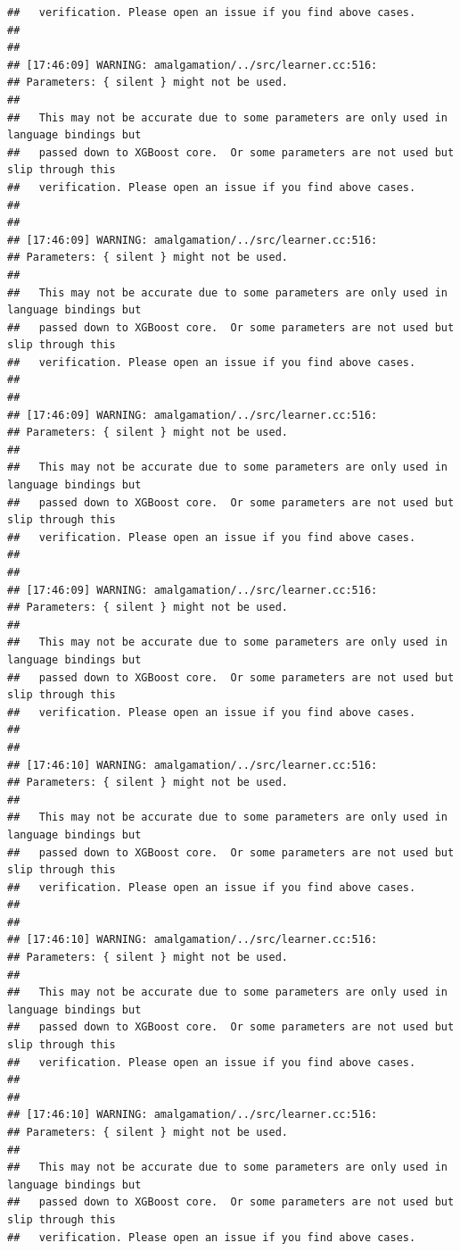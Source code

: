 \documentclass[AMS,STIX2COL]{WileyNJD-v2}\usepackage[]{graphicx}\usepackage[]{color}
\makeatletter
\newenvironment{kframe}{%
 \def\at@end@of@kframe{}%
 \ifinner\ifhmode%
  \def\at@end@of@kframe{\end{minipage}}%
  \begin{minipage}{\columnwidth}%
 \fi\fi%
 \def\FrameCommand##1{\hskip\@totalleftmargin \hskip-\fboxsep
 \colorbox{shadecolor}{##1}\hskip-\fboxsep
     \hskip-\linewidth \hskip-\@totalleftmargin \hskip\columnwidth}%
 \MakeFramed {\advance\hsize-\width
   \@totalleftmargin\z@ \linewidth\hsize
   \@setminipage}}%
 {\par\unskip\endMakeFramed%
 \at@end@of@kframe}
\newenvironment{knitrout}{}{} %
\makeatother
\begin{document}
\begin{knitrout}
\begin{kframe}
\begin{verbatim}
##   verification. Please open an issue if you find above cases.
## 
## 
## [17:46:09] WARNING: amalgamation/../src/learner.cc:516: 
## Parameters: { silent } might not be used.
## 
##   This may not be accurate due to some parameters are only used in language bindings but
##   passed down to XGBoost core.  Or some parameters are not used but slip through this
##   verification. Please open an issue if you find above cases.
## 
## 
## [17:46:09] WARNING: amalgamation/../src/learner.cc:516: 
## Parameters: { silent } might not be used.
## 
##   This may not be accurate due to some parameters are only used in language bindings but
##   passed down to XGBoost core.  Or some parameters are not used but slip through this
##   verification. Please open an issue if you find above cases.
## 
## 
## [17:46:09] WARNING: amalgamation/../src/learner.cc:516: 
## Parameters: { silent } might not be used.
## 
##   This may not be accurate due to some parameters are only used in language bindings but
##   passed down to XGBoost core.  Or some parameters are not used but slip through this
##   verification. Please open an issue if you find above cases.
## 
## 
## [17:46:09] WARNING: amalgamation/../src/learner.cc:516: 
## Parameters: { silent } might not be used.
## 
##   This may not be accurate due to some parameters are only used in language bindings but
##   passed down to XGBoost core.  Or some parameters are not used but slip through this
##   verification. Please open an issue if you find above cases.
## 
## 
## [17:46:10] WARNING: amalgamation/../src/learner.cc:516: 
## Parameters: { silent } might not be used.
## 
##   This may not be accurate due to some parameters are only used in language bindings but
##   passed down to XGBoost core.  Or some parameters are not used but slip through this
##   verification. Please open an issue if you find above cases.
## 
## 
## [17:46:10] WARNING: amalgamation/../src/learner.cc:516: 
## Parameters: { silent } might not be used.
## 
##   This may not be accurate due to some parameters are only used in language bindings but
##   passed down to XGBoost core.  Or some parameters are not used but slip through this
##   verification. Please open an issue if you find above cases.
## 
## 
## [17:46:10] WARNING: amalgamation/../src/learner.cc:516: 
## Parameters: { silent } might not be used.
## 
##   This may not be accurate due to some parameters are only used in language bindings but
##   passed down to XGBoost core.  Or some parameters are not used but slip through this
##   verification. Please open an issue if you find above cases.

\end{verbatim}
\end{kframe}
\end{knitrout}
\end{document}
